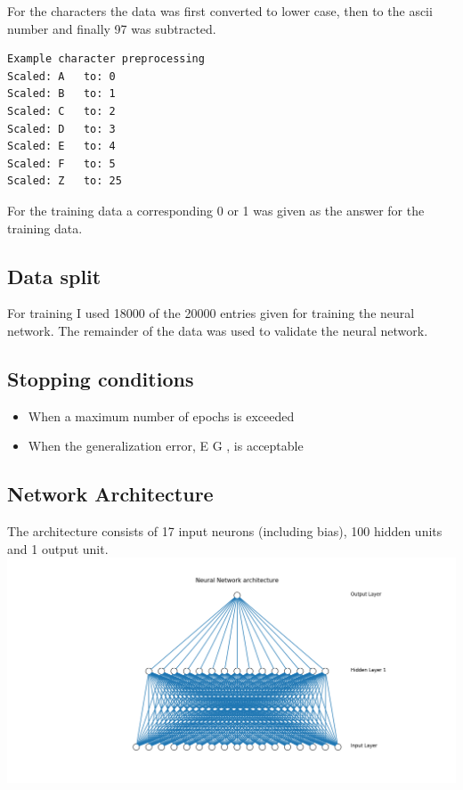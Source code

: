 \documentclass[11pt]{article}
\makeatletter
\def\maxwidth{\ifdim\Gin@nat@width>\linewidth\linewidth
    \else\Gin@nat@width\fi}
\let\Oldincludegraphics\includegraphics
\renewcommand{\includegraphics}[1]{\Oldincludegraphics[width=.8\maxwidth]{#1}}
\providecommand{\tightlist}{%
      \setlength{\itemsep}{0pt}\setlength{\parskip}{0pt}}
\makeatother
\begin{document}
For the characters the data was first converted to lower case, then to
the ascii number and finally 97 was subtracted.

\begin{verbatim}
Example character preprocessing
Scaled: A   to: 0
Scaled: B   to: 1
Scaled: C   to: 2
Scaled: D   to: 3
Scaled: E   to: 4
Scaled: F   to: 5
Scaled: Z   to: 25
\end{verbatim}

For the training data a corresponding 0 or 1 was given as the answer for
the training data.

    \hypertarget{data-split}{%
\subsection{Data split}\label{data-split}}

For training I used 18000 of the 20000 entries given for training the
neural network. The remainder of the data was used to validate the
neural network.

\hypertarget{stopping-conditions}{%
\subsection{Stopping conditions}\label{stopping-conditions}}

\begin{itemize}
\tightlist
\item
  When a maximum number of epochs is exceeded
\item
  When the generalization error, E G , is acceptable
\end{itemize}

\hypertarget{network-architecture}{%
\subsection{Network Architecture}\label{network-architecture}}

The architecture consists of 17 input neurons (including bias), 100
hidden units and 1 output unit. \includegraphics{Experiment2NN.png}
\end{document}

